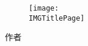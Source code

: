 \pagecolor{brandcolor}
\color{white}
\begin{titlepage}

    \begin{figure}[ht]
    \centering
    \texttt{[image: \\IMGTitlePage]}
    \end{figure}
    
    \begin{center}
        {\Huge \bf{\DICTDocTitle}}
    \end{center}
    
    \vfill
    
    \begin{center}
        {\Large 作者}
    \end{center}
    
    \begin{center}
        {\Large \DICTDocAuthor}
    \end{center}
    
     \begin{center}
        {\Large \DICTDocEmail}
    \end{center}
    
    \begin{center}
        {\Large \DICTDocDate}
    \end{center}
    
    \vspace{5mm}
    
\end{titlepage}
\pagecolor{white}
\color{black}